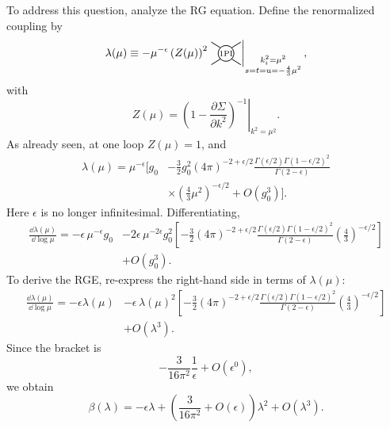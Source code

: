 To address this question, analyze the RG equation.  Define the renormalized
coupling by
\[
  \lambda(\mu)
  \equiv
  -\mu^{-\epsilon}\left(Z(\mu)\right)^2
  \left.
  \begin{tikzpicture}[baseline=-0.6ex,scale=0.55]
    \draw[line width=0.7pt] (0,0) circle (0.45);
    \node at (0,0) {\scriptsize 1PI};
    \draw[line width=0.7pt] (-0.85,0.65) -- (-0.32,0.32);
    \draw[line width=0.7pt] (-0.85,-0.65) -- (-0.32,-0.32);
    \draw[line width=0.7pt] (0.85,0.65) -- (0.32,0.32);
    \draw[line width=0.7pt] (0.85,-0.65) -- (0.32,-0.32);
  \end{tikzpicture}
  \right|_{\substack{k_i^2=\mu^2\\ s=t=u=-\frac43\mu^2}},
\]
with
\[
  Z(\mu)=
  \left.
  \left(1-\frac{\partial\Sigma}{\partial k^2}\right)^{-1}
  \right|_{k^2=\mu^2}.
\]
As already seen, at one loop \(Z(\mu)=1\), and
\[
\begin{split}
  \lambda(\mu)
  =
  \mu^{-\epsilon}
  \bigg[
    g_0
    &-
    \frac{3}{2}g_0^2
    (4\pi)^{-2+\epsilon/2}
    \frac{\Gamma(\epsilon/2)\Gamma(1-\epsilon/2)^2}
         {\Gamma(2-\epsilon)}
\\
    &\times
    \left(\frac{4}{3}\mu^2\right)^{-\epsilon/2}
    +O(g_0^3)
  \bigg].
\end{split}
\]
Here \(\epsilon\) is no longer infinitesimal.  Differentiating,
\[
\begin{split}
  \frac{\dd\lambda(\mu)}{\dd\log\mu}
  =
  -\epsilon\,\mu^{-\epsilon}g_0
  &-
  2\epsilon\,\mu^{-2\epsilon}g_0^2
  \left[
    -\frac{3}{2}
    (4\pi)^{-2+\epsilon/2}
    \frac{\Gamma(\epsilon/2)\Gamma(1-\epsilon/2)^2}
         {\Gamma(2-\epsilon)}
    \left(\frac43\right)^{-\epsilon/2}
  \right]
\\
  &+O(g_0^3).
\end{split}
\]
To derive the RGE, re-express the right-hand side in terms of
\(\lambda(\mu)\):
\[
\begin{split}
  \frac{\dd\lambda(\mu)}{\dd\log\mu}
  =
  -\epsilon\lambda(\mu)
  &-
  \epsilon\,\lambda(\mu)^2
  \left[
    -\frac{3}{2}
    (4\pi)^{-2+\epsilon/2}
    \frac{\Gamma(\epsilon/2)\Gamma(1-\epsilon/2)^2}
         {\Gamma(2-\epsilon)}
    \left(\frac43\right)^{-\epsilon/2}
  \right]
\\
  &+O(\lambda^3).
\end{split}
\]
Since the bracket is
\[
  -\frac{3}{16\pi^2}\frac{1}{\epsilon}+O(\epsilon^0),
\]
we obtain
\[
  \beta(\lambda)
  =
  -\epsilon\lambda
  +
  \left(\frac{3}{16\pi^2}+O(\epsilon)\right)\lambda^2
  +
  O(\lambda^3).
\]
